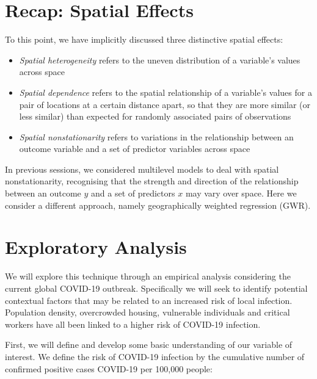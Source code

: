 \documentclass[
  letterpaper,
  DIV=11,
  numbers=noendperiod,
  oneside]{scrreprt}
\begin{document}
\section{Recap: Spatial Effects}\label{recap-spatial-effects}

To this point, we have implicitly discussed three distinctive spatial
effects:

\begin{itemize}
\item
  \emph{Spatial heterogeneity} refers to the uneven distribution of a
  variable's values across space
\item
  \emph{Spatial dependence} refers to the spatial relationship of a
  variable's values for a pair of locations at a certain distance apart,
  so that they are more similar (or less similar) than expected for
  randomly associated pairs of observations
\item
  \emph{Spatial nonstationarity} refers to variations in the
  relationship between an outcome variable and a set of predictor
  variables across space
\end{itemize}

In previous sessions, we considered multilevel models to deal with
spatial nonstationarity, recognising that the strength and direction of
the relationship between an outcome \(y\) and a set of predictors \(x\)
may vary over space. Here we consider a different approach, namely
geographically weighted regression (GWR).

\section{Exploratory Analysis}\label{exploratory-analysis}

We will explore this technique through an empirical analysis considering
the current global COVID-19 outbreak. Specifically we will seek to
identify potential contextual factors that may be related to an
increased risk of local infection. Population density, overcrowded
housing, vulnerable individuals and critical workers have all been
linked to a higher risk of COVID-19 infection.

First, we will define and develop some basic understanding of our
variable of interest. We define the risk of COVID-19 infection by the
cumulative number of confirmed positive cases COVID-19 per 100,000
people:
\end{document}
